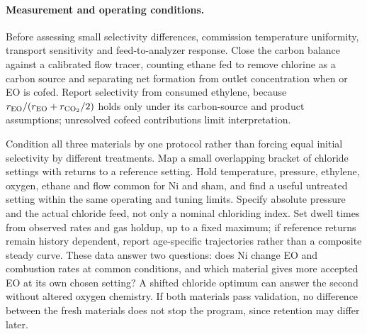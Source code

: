 \paragraph{Measurement and operating conditions.}
Before assessing small selectivity differences, commission temperature uniformity, transport sensitivity and feed-to-analyzer response. Close the carbon balance against a calibrated flow tracer, counting ethane fed to remove chlorine as a carbon source and separating net formation from outlet concentration when \COtwo{} or EO is cofed. Report selectivity from consumed ethylene, because $r_{\rm EO}/(r_{\rm EO}+r_{\rm CO_2}/2)$ holds only under its carbon-source and product assumptions; unresolved cofeed contributions limit interpretation.

Condition all three materials by one protocol rather than forcing equal initial selectivity by different treatments. Map a small overlapping bracket of chloride settings with returns to a reference setting. Hold temperature, pressure, ethylene, oxygen, ethane and flow common for Ni and sham, and find a useful untreated setting within the same operating and tuning limits. Specify absolute pressure and the actual chloride feed, not only a nominal chloriding index. Set dwell times from observed rates and gas holdup, up to a fixed maximum; if reference returns remain history dependent, report age-specific trajectories rather than a composite steady curve. These data answer two questions: does Ni change EO and combustion rates at common conditions, and which material gives more accepted EO at its own chosen setting? A shifted chloride optimum can answer the second without altered oxygen chemistry. If both materials pass validation, no difference between the fresh materials does not stop the program, since retention may differ later.

